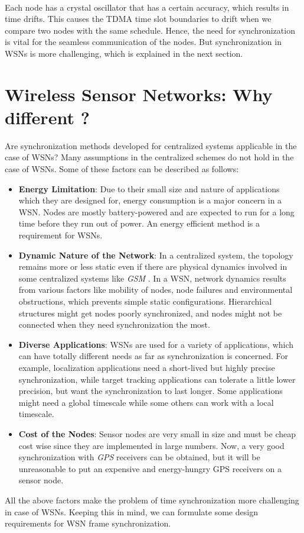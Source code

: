 \documentclass[a4paper,10pt]{report}
\begin{document}
\paragraph*{}
Each node has a crystal oscillator that has a certain accuracy, which results in time drifts. This causes the TDMA time slot boundaries to drift when we compare two nodes with the same schedule. Hence, the need for synchronization is vital for the seamless communication of the nodes. But synchronization in WSNs is more challenging, which is explained in the next section.
\section{\textbf{Wireless Sensor Networks: Why different ?}}
Are synchronization methods developed for centralized systems applicable in the case of WSNs? Many assumptions in the centralized schemes do not hold in the case of WSNs. Some of these factors can be described as follows:
\begin{itemize}
\item \textbf{Energy Limitation}: Due to their small size and nature of applications which they are designed for, energy consumption is a major concern in a WSN. Nodes are mostly battery-powered and are expected to run for a long time before they run out of power. An energy efficient method is a requirement for WSNs.
\item \textbf{Dynamic Nature of the Network}: In a centralized system, the topology remains more or less static even if there are physical
dynamics involved  in some centralized systems like \textit{GSM} . In a WSN, network dynamics results from various factors like mobility of nodes, node failures and environmental obstructions, which prevents simple static configurations. Hierarchical structures might get nodes poorly synchronized, and nodes might not be connected when they need
synchronization the most.
\item \textbf{Diverse Applications}: WSNs are used for a variety of applications, which can have totally different needs as far as synchronization is concerned. For example, localization applications need a short-lived but highly
precise synchronization, while target tracking applications can tolerate a little lower precision, but want the synchronization to
last longer. Some applications might need a global timescale while some others can work with a local timescale.
\item \textbf{Cost of the Nodes}: Sensor nodes are very small in size and must be cheap cost wise since they are implemented in large
numbers. Now, a very good synchronization with \textit{GPS} receivers can be obtained, but it will be unreasonable to put an expensive and energy-hungry GPS receivers on a sensor node.
\end{itemize}
All the above factors make the problem of time synchronization more challenging in case of WSNs. Keeping this in mind, we can formulate
some design requirements for WSN frame synchronization.
\end{document}
